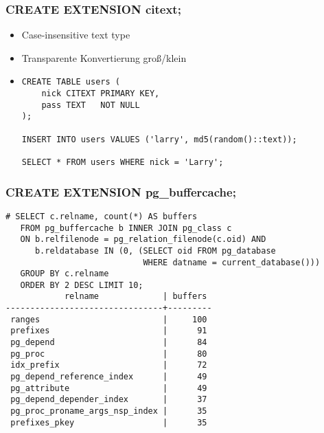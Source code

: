 \documentclass[utf8,hyperref={pdftex,colorlinks,linkcolor=black,citecolor=black,urlcolor=black,filecolor=black,plainpages=false},xcolor=table,hyperref]{beamer}
\begin{document}
\begin{frame}[containsverbatim]
	\frametitle{CREATE EXTENSION citext;}
	\begin{itemize}
		\item Case-insensitive text type
		\item Transparente Konvertierung groß/klein
		\item \begin{verbatim}
CREATE TABLE users (
    nick CITEXT PRIMARY KEY,
    pass TEXT   NOT NULL
);

INSERT INTO users VALUES ('larry', md5(random()::text));

SELECT * FROM users WHERE nick = 'Larry';
\end{verbatim}
\end{itemize}
\end{frame}

\begin{frame}[containsverbatim]
	\frametitle{CREATE EXTENSION pg_buffercache;}
	\small
	\begin{verbatim}
# SELECT c.relname, count(*) AS buffers
   FROM pg_buffercache b INNER JOIN pg_class c
   ON b.relfilenode = pg_relation_filenode(c.oid) AND
      b.reldatabase IN (0, (SELECT oid FROM pg_database
                            WHERE datname = current_database()))
   GROUP BY c.relname
   ORDER BY 2 DESC LIMIT 10;
            relname             | buffers 
--------------------------------+---------
 ranges                         |     100
 prefixes                       |      91
 pg_depend                      |      84
 pg_proc                        |      80
 idx_prefix                     |      72
 pg_depend_reference_index      |      49
 pg_attribute                   |      49
 pg_depend_depender_index       |      37
 pg_proc_proname_args_nsp_index |      35
 prefixes_pkey                  |      35
 \end{verbatim}
\end{frame}

\end{document}
